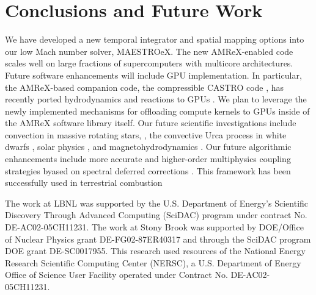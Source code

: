 \section{Conclusions and Future Work}\label{sec:conclusions}
We have developed a new temporal integrator and spatial mapping options into our low Mach number solver, MAESTROeX.
The new AMReX-enabled code scales well on large fractions of supercomputers with multicore architectures.
Future software enhancements will include GPU implementation.
In particular, the AMReX-based companion code, the compressible CASTRO code \citep{CASTRO}, has recently ported hydrodynamics and reactions to GPUs \citep{CASTRO_GPU}.
We plan to leverage the newly implemented mechanisms for offloading compute kernels to GPUs inside of the AMReX software library itself.
Our future scientific investigations include convection in massive rotating stars, \citep{heger2000presupernova}, the convective Urca process in white dwarfs \citep{willcox2016type}, solar physics \citep{wood2018self}, and magnetohydrodynamics \citep{wood2015three,wood2011sun}.
Our future algorithmic enhancements include more accurate and higher-order multiphysics coupling strategies byased on spectral deferred corrections \citep{dutt2000spectral,bourlioux2003high}.
This framework has been successfully used in terrestrial combustion \citep{pazner2016high,nonaka2018conservative}

\acknowledgements

The work at LBNL was supported by the U.S. Department of Energy's
Scientific Discovery Through Advanced Computing (SciDAC) program under
contract No. DE-AC02-05CH11231.  The work at Stony Brook was supported
by DOE/Office of Nuclear Physics grant DE-FG02-87ER40317 and through
the SciDAC program DOE grant DE-SC0017955.  This research used
resources of the National Energy Research Scientific Computing Center
(NERSC), a U.S. Department of Energy Office of Science User Facility
operated under Contract No. DE-AC02-05CH11231.


